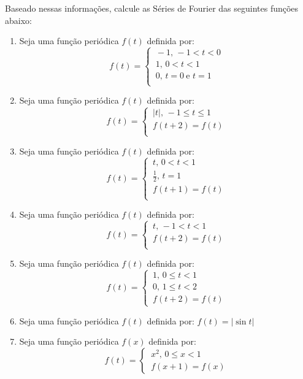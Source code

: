 \documentclass[11pt,a4paper]{article}
\begin{document}
\begin{enumerate}
		Baseado nessas informações, calcule as Séries de Fourier das seguintes funções abaixo:
		
		\begin{enumerate}
		\item Seja uma função periódica $f(t)$ definida por: 
		$$f(t) = 
			\begin{cases}
				\, -1,\, -1 < t < 0 \\
				\, 1,\, 0 < t < 1 \\
				\, 0,\,  t = 0\ \textrm{e } t = 1 \\
			\end{cases}
		$$
		
		\item Seja uma função periódica $f(t)$ definida por: 
		$$f(t) = 
			\begin{cases}
				\, |t|,\, -1 \leq t \leq 1 \\
				\, f(t+2) = f(t) \\
			\end{cases}
		$$
		
		\item Seja uma função periódica $f(t)$ definida por: 
		$$f(t) = 
			\begin{cases}
				\, t,\, 0 < t < 1 \\
				\, \displaystyle\frac{1}{2},\, t = 1 \\
				\, f(t+1) = f(t) \\
			\end{cases}
		$$
		
		\item Seja uma função periódica $f(t)$ definida por: 
		$$f(t) = 
			\begin{cases}
				\, t,\, -1 < t < 1 \\
				\, f(t+2) = f(t) \\
			\end{cases}
		$$
		
		\item Seja uma função periódica $f(t)$ definida por: 
		$$f(t) = 
			\begin{cases}
				\, 1,\, 0 \leq t < 1 \\
				\, 0,\, 1 \leq t < 2 \\
				\, f(t+2) = f(t)
			\end{cases}
		$$
		
		\item Seja uma função periódica $f(t)$ definida por: $f(t) = |\sin t|$
		
		\item Seja uma função periódica $f(x)$ definida por: 
		$$f(t) = 
			\begin{cases}
				\, x^2,\, 0 \leq x < 1 \\
				\, f(x+1) = f(x)
			\end{cases}
		$$
		

\end{enumerate}
\end{enumerate}
\end{document}

